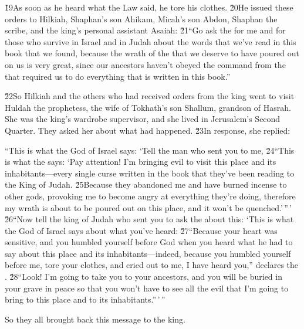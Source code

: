 \v{19}As soon as he heard what the Law said, he tore his clothes. \v{20}He issued these orders to Hilkiah, Shaphan's son Ahikam, Micah's son Abdon, Shaphan the scribe, and the king's personal assistant Asaiah: \v{21}``Go ask the  for me and for those who survive in Israel and in Judah about the words that we've read in this book that we found, because the wrath of the  that we deserve to have poured out on us is very great, since our ancestors haven't obeyed the command from the  that required us to do everything that is written in this book.''

\v{22}So Hilkiah and the others who had received orders from the king went to visit Huldah the prophetess, the wife of Tokhath's son Shallum, grandson of Hasrah. She was the king's wardrobe supervisor, and she lived in Jerusalem's Second Quarter. They asked her about what had happened. \v{23}In response, she replied:

\begin{poetry}
\poeml ``This is what the  God of Israel says: `Tell the man who sent you to me, \v{24}``This is what the  says: `Pay attention! I'm bringing evil to visit this place and its inhabitants---every single curse written in the book that they've been reading to the King of Judah. \v{25}Because they abandoned me and have burned incense to other gods, provoking me to become angry at everything they're doing, therefore my wrath is about to be poured out on this place, and it won't be quenched.'\,''\,' \\
\poeml \v{26}``Now tell the king of Judah who sent you to ask the  about this: `This is what the  God of Israel says about what you've heard: \v{27}``Because your heart was sensitive, and you humbled yourself before God when you heard what he had to say about this place and its inhabitants---indeed, because you humbled yourself before me, tore your clothes, and cried out to me, I have heard you,'' declares the . \v{28}``Look! I'm going to take you to your ancestors, and you will be buried in your grave in peace so that you won't have to see all the evil that I'm going to bring to this place and to its inhabitants.''\,'\,''
\end{poetry}

So they all brought back this message to the king.

